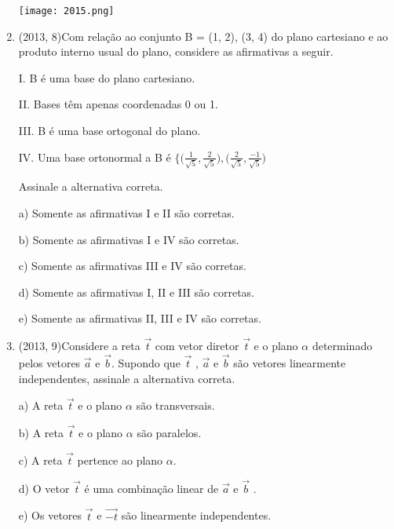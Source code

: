 \documentclass{article}
\begin{document}
\begin{enumerate}
\texttt{[image: 2015.png]}\newline







\item(2013, 8)Com relação ao conjunto B = {(1, 2), (3, 4)} do plano cartesiano e ao produto interno usual do plano, considere as afirmativas a seguir.    

I. B é uma base do plano cartesiano.

II. Bases têm apenas coordenadas 0 ou 1.

III. B é uma base ortogonal do plano.

IV. Uma base ortonormal a B é $\Bigg\{ \bigg(\frac{1}{\sqrt{5}},\frac{2}{\sqrt{5}} \bigg), \bigg(\frac{2}{\sqrt{5}}, \frac{-1}{\sqrt{5}}   \bigg) $

Assinale a alternativa correta.

a) Somente as afirmativas I e II são corretas.

b) Somente as afirmativas I e IV são corretas.

c) Somente as afirmativas III e IV são corretas.

d) Somente as afirmativas I, II e III são corretas.

e) Somente as afirmativas II, III e IV são corretas.\newline





\item(2013, 9)Considere a reta $ \vec t$ com vetor diretor $ \vec t$ e o plano $\alpha$ determinado pelos vetores $ \vec a$  e $ \vec b$. Supondo que $ \vec t$ , $ \vec a$ e  $\vec b$ são vetores linearmente independentes, assinale a alternativa correta.

a) A reta $ \vec t$ e o plano $\alpha$ são transversais.

b) A reta $ \vec t$ e o plano $\alpha$ são paralelos.

c) A reta $ \vec t$ pertence ao plano $\alpha$.

d) O vetor $ \vec t$ é uma combinação linear de $ \vec a$ e $ \vec b$ .

e) Os vetores $ \vec t$ e $  \vec{-t}$ são linearmente independentes.\newline











\end{enumerate}
\end{document}
